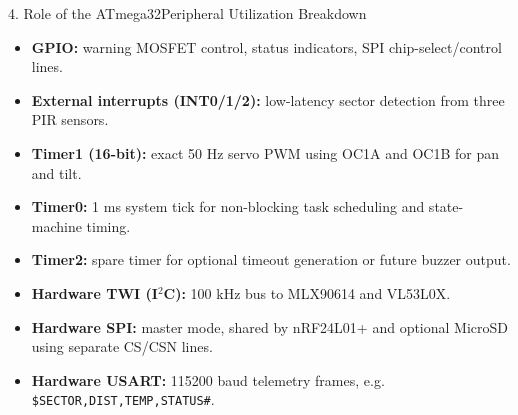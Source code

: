 \documentclass[aspectratio=169, 10pt]{beamer}
\begin{document}
\begin{frame}{4. Role of the ATmega32}{Peripheral Utilization Breakdown}
    \footnotesize
    \begin{itemize}
        \item \textbf{GPIO:} warning MOSFET control, status indicators, SPI chip-select/control lines.
        \item \textbf{External interrupts (INT0/1/2):} low-latency sector detection from three PIR sensors.
        \item \textbf{Timer1 (16-bit):} exact 50 Hz servo PWM using OC1A and OC1B for pan and tilt.
        \item \textbf{Timer0:} 1 ms system tick for non-blocking task scheduling and state-machine timing.
        \item \textbf{Timer2:} spare timer for optional timeout generation or future buzzer output.
        \item \textbf{Hardware TWI (I$^2$C):} 100 kHz bus to MLX90614 and VL53L0X.
        \item \textbf{Hardware SPI:} master mode, shared by nRF24L01+ and optional MicroSD using separate CS/CSN lines.
        \item \textbf{Hardware USART:} 115200 baud telemetry frames, e.g. \texttt{\$SECTOR,DIST,TEMP,STATUS\#}.
    \end{itemize}
\end{frame}
\end{document}
